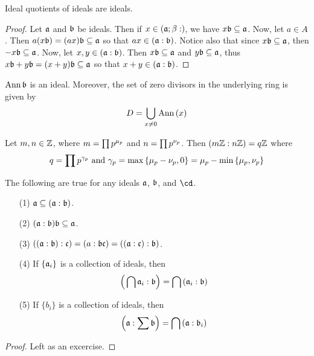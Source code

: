 \begin{lemma}\label{1.9.8}
    Ideal quotients of ideals are ideals.
\end{lemma}
\begin{proof}
    Let $\af$ and $\bf$ be ideals. Then if $x \in (\af;\b:)$, we have $x\bf
    \subseteq \af$. Now, let $a \in A$. Then $a(x\bf)=(ax)\bf \subseteq \af$ so
    that $ax \in (\af:\bf)$. Notice also that since $x\bf \subseteq \af$, then
    $-x\bf \subseteq \af$. Now, let $x,y \in (\af:\bf)$. Then $x\bf \subseteq
    \af$ and $y\bf \subseteq \af$, thus $x\bf+y\bf=(x+y)\bf \subseteq \af$ so
    that $x+y \in (\af:\bf)$.
\end{proof}
\begin{corollary}
    $\Ann{\bf}$ is an ideal. Moreover, the set of zero divisors in the
    underlying ring is given by
    \begin{equation*}
        D=\bigcup_{x \neq 0}{\Ann{(x)}}
    \end{equation*}
\end{corollary}

\begin{example}\label{example_1.7}
    Let $m,n \in \Z$, where  $m=\prod{p^{\m_p}}$ and $n=\prod{p^{\v_p}}$. Then
    $(m\Z:n\Z)=q\Z$ where
    \begin{equation*}
        q=\prod{p^{\y_p}} \text{ and }
        \y_p=\max{\{\m_p-\v_p,0\}}=\m_p-\min{\{\m_p,\v_p\}}
    \end{equation*}
\end{example}

\begin{lemma}\label{1.9.9}
    The following are true for any ideals $\af$,  $\bf$, and  $\cd$.
    \begin{enumerate}
        \item[(1)] $\af \subseteq (\af:\bf)$.

        \item[(2)] $(\af:\bf)\bf \subseteq \af$.

        \item[(3)] $((\af:\bf):\cf)=(a:\bf\cf)=((\af:\cf):\bf)$.

        \item[(4)] If $\{\af_i\}$ is a collection of ideals, then
            \begin{equation*}
                \Big{(} \bigcap{\af_i}:\bf \Big{)}=\bigcap{(\af_i:\bf)}
            \end{equation*}

        \item[(5)] If $\{b_i\}$ is a collection of ideals, then
            \begin{equation*}
                \Big{(} \af:\sum{\bf} \Big{)}=\bigcap{(\af:\bf_i)}
            \end{equation*}
    \end{enumerate}
\end{lemma}
\begin{proof}
    Left as an excercise.
\end{proof}

